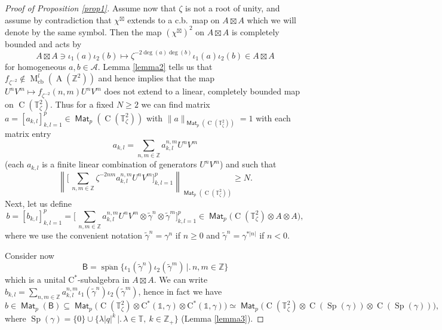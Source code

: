 \documentclass[12pt,reqno,a4paper]{amsart}
\theoremstyle{definition}
\newcommand{\cst}{\ensuremath{\mathrm{C}^*}}
\newcommand{\I}{\mathds{1}}
\newcommand{\id}{\mathrm{id}}
\newcommand{\tens}{\otimes}
\newcommand{\TT}{\mathbb{T}}
\newcommand{\ZZ}{\mathbb{Z}}
\newcommand{\cA}{\mathscr{A}}
\DeclareMathOperator{\A}{A}
\DeclareMathOperator{\C}{C}
\DeclareMathOperator{\M}{M}
\DeclareMathOperator{\Mat}{\mathsf{Mat}}
\DeclareMathOperator{\cb}{cb}
\DeclareMathOperator{\Sp}{Sp}
\numberwithin{equation}{section}
\begin{document}
\begin{appendices}
\begin{proof}[Proof of Proposition \ref{prop1}]
Assume now that $\zeta$ is not a root of unity, and assume by contradiction that $\chi^{\boxtimes}$ extends to a c.b.~map on $A\boxtimes A$ which we will denote by the same symbol. Then the map $(\chi^{\boxtimes})^2$ on $A\boxtimes A$ is completely bounded and acts by
\[
A\boxtimes A\ni\iota_1(a)\iota_2(b)\longmapsto
\zeta^{-2\deg(a)\deg(b)}\iota_1(a)\iota_2(b)\in A\boxtimes A
\]
for homogeneous $a,b\in\cA$. Lemma \ref{lemma2} tells us that $f_{\zeta^{-2}}\not\in \M^l_{\cb}(\A(\ZZ^2))$ and hence \cite[Proposition 7.2]{QuantumTori} implies that the map $ U^nV^m\mapsto f_{\zeta^{-2}}(n,m) U^nV^m$ does not extend to a linear, completely bounded map on $\C(\TT^2_\zeta)$. Thus for a fixed $N\ge 2$ we can find matrix $a=[a_{k,l}]_{k,l=1}^{p}\in\Mat_p(\C(\TT^2_\zeta))$ with $\|a\|_{\Mat_p(\C(\TT^2_\zeta))}=1$ with each matrix entry
\begin{equation}\label{eq5}
a_{k,l}=\sum_{n,m\in\ZZ} a_{k,l}^{n,m} U^n V^m%
\end{equation}
(each $a_{k,l}$ is a finite linear combination of generators $U^nV^m$) and such that
\begin{equation}\label{eq6}
\left\|\biggl[\,
\sum_{n,m\in\ZZ}
 \zeta^{-2nm} a_{k,l}^{n,m} U^n V^m
\biggr]_{k,l=1}^{p}\right\|_{\Mat_p(\C(\TT^2_\zeta))}\ge N.
\end{equation}
Next, let us define
\[
b=[b_{k,l}]_{k,l=1}^{p}=
\biggl[\,
\sum_{n,m\in\ZZ}
a^{n,m}_{k,l} U^n V^m\tens\tilde{\gamma}^n\tens\tilde{\gamma}^m
\biggr]_{k,l=1}^{p}\in\Mat_p\bigl(\C(\TT^2_\zeta)\tens A\tens A\bigr),
\]
where we use the convenient notation $\tilde{\gamma}^n=\gamma^n$ if $n\ge 0$ and $\tilde{\gamma}^n=\gamma^{ * |n|}$ if $n<0$.

Consider now
\[
\mathsf{B}=\overline{\operatorname{span}}
\bigl\{\iota_1(\tilde{\gamma}^n)\iota_2(\tilde{\gamma}^m)\,\bigr|\bigl.\,n,m\in\ZZ\bigr\}
\]
which is a unital \cst-subalgebra in $A\boxtimes A$. We can write $b_{k,l}=\sum\limits_{n,m\in\ZZ} a^{n,m}_{k,l}\iota_1(\tilde{\gamma}^n)\iota_2(\tilde{\gamma}^m)$, hence in fact we have
\[
b\in\Mat_p(\mathsf{B})\subseteq\Mat_p\bigl(\C(\TT^2_\zeta)\tens\cst(\I,\gamma)\tens \cst(\I,\gamma)\bigr)\simeq\Mat_p\bigl(\C(\TT^2_\zeta)\tens\C(\Sp(\gamma))\tens\C(\Sp(\gamma))\bigr),
\]
where $\operatorname{Sp}(\gamma)=\{0\}\cup\bigl\{\lambda|q|^{k}\,\bigr|\bigl.\,\lambda\in\TT,\:k\in\ZZ_+\bigr\}$ (Lemma \ref{lemma3}).


\end{proof}
\end{appendices}
\end{document}
